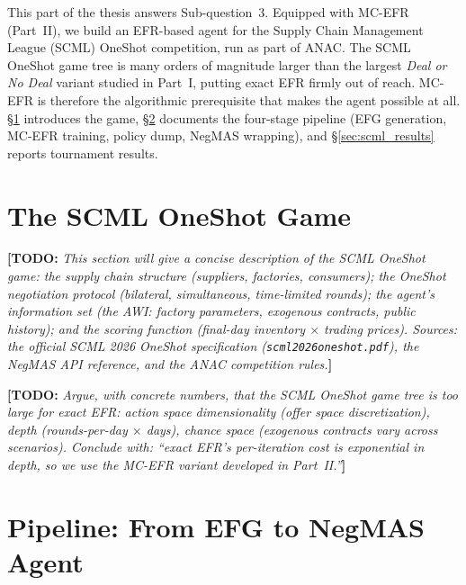 \documentclass[11pt]{article}
\newcommand{\todo}[1]{{\color{red!70!black}\textbf{[TODO: }\emph{#1}\textbf{]}}}
\begin{document}
This part of the thesis answers Sub-question~3. Equipped with MC-EFR (Part~II), we build an EFR-based agent for the Supply Chain Management League (SCML) OneShot competition, run as part of ANAC. The SCML OneShot game tree is many orders of magnitude larger than the largest \emph{Deal or No Deal} variant studied in Part~I, putting exact EFR firmly out of reach. MC-EFR is therefore the algorithmic prerequisite that makes the agent possible at all. \S\ref{sec:scml_game} introduces the game, \S\ref{sec:scml_pipeline} documents the four-stage pipeline (EFG generation, MC-EFR training, policy dump, NegMAS wrapping), and \S\ref{sec:scml_results} reports tournament results.

\section{The SCML OneShot Game}
\label{sec:scml_game}

\todo{This section will give a concise description of the SCML OneShot game: the supply chain structure (suppliers, factories, consumers); the OneShot negotiation protocol (bilateral, simultaneous, time-limited rounds); the agent's information set (the AWI: factory parameters, exogenous contracts, public history); and the scoring function (final-day inventory $\times$ trading prices). Sources: the official SCML 2026 OneShot specification (\texttt{scml2026oneshot.pdf}), the NegMAS API reference, and the ANAC competition rules.}

\todo{Argue, with concrete numbers, that the SCML OneShot game tree is too large for exact EFR: action space dimensionality (offer space discretization), depth (rounds-per-day $\times$ days), chance space (exogenous contracts vary across scenarios). Conclude with: ``exact EFR's per-iteration cost is exponential in depth, so we use the MC-EFR variant developed in Part~II.''}

\section{Pipeline: From EFG to NegMAS Agent}
\label{sec:scml_pipeline}
\end{document}
